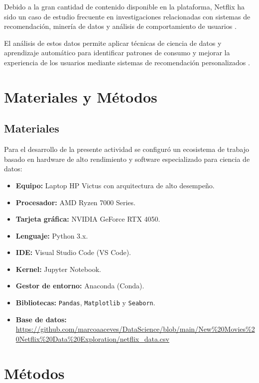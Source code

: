 \documentclass[12pt]{article}
\begin{document}
Debido a la gran cantidad de contenido disponible en la plataforma, Netflix ha sido un caso de 
estudio frecuente en investigaciones relacionadas con sistemas de recomendación, minería de datos 
y análisis de comportamiento de usuarios \cite{gomez2016netflix}.

El análisis de estos datos permite aplicar técnicas de ciencia de datos y aprendizaje automático 
para identificar patrones de consumo y mejorar la experiencia de los usuarios mediante sistemas 
de recomendación personalizados \cite{russell2021ai}.

\vspace{6cm}
\section{Materiales y Métodos}

\subsection{Materiales}

Para el desarrollo de la presente actividad se configuró un ecosistema de trabajo basado en hardware de alto rendimiento y software especializado para ciencia de datos:

\begin{itemize} 
    \item \textbf{Equipo:} Laptop HP Victus con arquitectura de alto desempeño.
    \item \textbf{Procesador:} AMD Ryzen 7000 Series.
    \item \textbf{Tarjeta gráfica:} NVIDIA GeForce RTX 4050.
    \item \textbf{Lenguaje:} Python 3.x.
    \item \textbf{IDE:} Visual Studio Code (VS Code).
    \item \textbf{Kernel:} Jupyter Notebook.
    \item \textbf{Gestor de entorno:} Anaconda (Conda).
    \item \textbf{Bibliotecas:} \texttt{Pandas}, \texttt{Matplotlib} y \texttt{Seaborn}.
    \item \textbf{Base de datos:} 
    \\ \url{https://github.com/marcoaaceves/DataScience/blob/main/New%20Movies%20Netflix%20Data%20Exploration/netflix_data.csv}
\end{itemize}

\section{Métodos}
\end{document}

